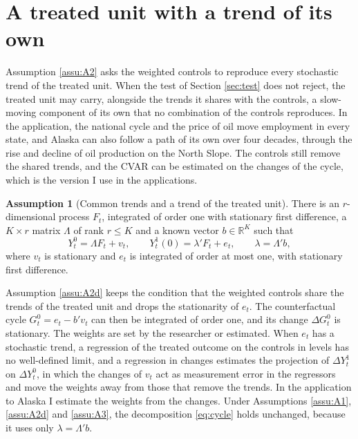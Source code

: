 \documentclass[12pt,a4paper]{article}
\theoremstyle{definition}
\newtheorem{assumption}{Assumption}
\theoremstyle{definition}\newtheorem{example}{Example}
\theoremstyle{definition}\newtheorem{definition}{Definition}
\begin{document}
\section{A treated unit with a trend of its own\label{sec:ext}}

Assumption \ref{assu:A2} asks the weighted controls to reproduce every stochastic trend of the treated unit. When the test of Section \ref{sec:test} does not reject, the treated unit may carry, alongside the trends it shares with the controls, a slow-moving component of its own that no combination of the controls reproduces. In the application, the national cycle and the price of oil move employment in every state, and Alaska can also follow a path of its own over four decades, through the rise and decline of oil production on the North Slope. The controls still remove the shared trends, and the CVAR can be estimated on the changes of the cycle, which is the version I use in the applications.

\begin{assumption}[Common trends and a trend of the treated unit\label{assu:A2d}]
There is an $r$-dimensional process $F_t$, integrated of order one with stationary first difference, a $K\times r$ matrix $\Lambda$ of rank $r\leq K$ and a known vector $b\in\mathbb{R}^K$ such that
\begin{equation*}
Y^0_t=\Lambda F_t+v_t,\qquad Y^1_t(0)=\lambda'F_t+e_t,\qquad \lambda=\Lambda'b,
\end{equation*}
where $v_t$ is stationary and $e_t$ is integrated of order at most one, with stationary first difference.
\end{assumption}

Assumption \ref{assu:A2d} keeps the condition that the weighted controls share the trends of the treated unit and drops the stationarity of $e_t$. The counterfactual cycle $G^0_t=e_t-b'v_t$ can then be integrated of order one, and its change $\Delta G^0_t$ is stationary. The weights are set by the researcher or estimated. When $e_t$ has a stochastic trend, a regression of the treated outcome on the controls in levels has no well-defined limit, and a regression in changes estimates the projection of $\Delta Y^1_t$ on $\Delta Y^0_t$, in which the changes of $v_t$ act as measurement error in the regressors and move the weights away from those that remove the trends. In the application to Alaska I estimate the weights from the changes. Under Assumptions \ref{assu:A1}, \ref{assu:A2d} and \ref{assu:A3}, the decomposition \eqref{eq:cycle} holds unchanged, because it uses only $\lambda=\Lambda'b$.
\end{document}
